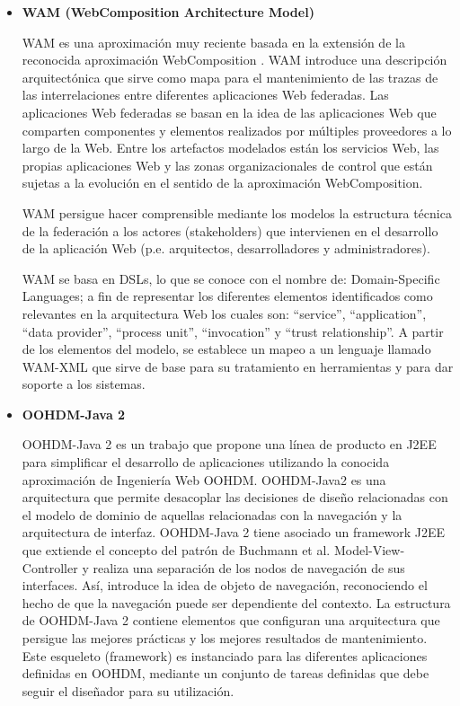 \begin{itemize}
\item \textbf{WAM (WebComposition Architecture Model)}

WAM \cite{WAM} es una aproximación muy reciente basada en la extensión de la
reconocida aproximación WebComposition \cite{WebComposition}. WAM introduce una descripción
arquitectónica que sirve como mapa para el mantenimiento de las trazas de las
interrelaciones entre diferentes aplicaciones Web federadas. Las aplicaciones
Web federadas se basan en la idea de las aplicaciones Web que comparten
componentes y elementos realizados por múltiples proveedores a lo largo de la
Web. Entre los artefactos modelados están los servicios Web, las propias
aplicaciones Web y las zonas organizacionales de control que están sujetas a la
evolución en el sentido de la aproximación WebComposition.

WAM persigue hacer comprensible mediante los modelos la estructura técnica de
la federación a los actores (stakeholders) que intervienen en el desarrollo de
la aplicación Web (p.e. arquitectos, desarrolladores y administradores).

WAM se basa en DSLs, lo que se conoce con el nombre de: Domain-Specific Languages; a fin de representar los diferentes
elementos identificados como relevantes en la arquitectura Web los cuales son:
“service”, “application”, “data provider”, “process unit”, “invocation” y “trust relationship”. A partir de los elementos del modelo, se establece un mapeo
a un lenguaje llamado WAM-XML que sirve de base para su tratamiento en
herramientas y para dar soporte a los sistemas. 



\item \textbf{OOHDM-Java 2}

OOHDM-Java 2 \cite{OOHDM} es un trabajo que propone una línea de producto en J2EE para
simplificar el desarrollo de aplicaciones utilizando la conocida aproximación de
Ingeniería Web OOHDM. OOHDM-Java2 es una arquitectura que permite
desacoplar las decisiones de diseño relacionadas con el modelo de dominio de
aquellas relacionadas con la navegación y la arquitectura de interfaz.
OOHDM-Java 2 tiene asociado un framework J2EE que extiende el concepto del
patrón de Buchmann et al. \cite{Buchmann} Model-View-Controller y realiza una separación de
los nodos de navegación de sus interfaces. Así, introduce la idea de objeto de
navegación, reconociendo el hecho de que la navegación puede ser dependiente del
contexto. La estructura de OOHDM-Java 2 contiene elementos que configuran una
arquitectura que persigue las mejores prácticas y los mejores resultados de
mantenimiento. Este esqueleto (framework) es instanciado para las diferentes
aplicaciones definidas en OOHDM, mediante un conjunto de tareas definidas que
debe seguir el diseñador para su utilización.

\end{itemize}



